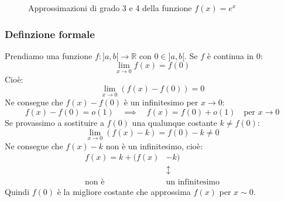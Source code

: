 \begin{figure}
\centering
\begin{subfigure}{0.49\textwidth}
\centering
\end{subfigure}
\begin{subfigure}{0.49\textwidth}
\centering
\end{subfigure}
	\caption{Approssimazioni di grado 3 e 4 della funzione $f(x) = e^x$} 
\label{fig:ApproxEsponenziale2}
\end{figure}



\subsubsection{Definzione formale}
Prendiamo una funzione $f:]a,b[ \to \mathbb{R}$ con $0 \in ]a,b[$. Se $f$ è continua in 0:
\begin{equation*}
	\lim_{x \to 0} f(x) = f(0)
\end{equation*}
Cioè:
\begin{equation*}
	\lim_{x \to 0} (f(x) - f(0)) = 0
\end{equation*}
Ne consegue che $f(x) - f(0)$ è un infinitesimo per $x \to 0$:
\begin{equation*}
	f(x) - f(0) = o(1) \quad \implies \quad f(x) = f(0) + o(1) \quad \text{per } x \to 0
\end{equation*}
Se provassimo a sostituire a $f(0)$ una qualunque costante $k \neq f(0)$:
\begin{equation*}
	\lim_{x \to 0} (f(x) - k) = f(0) - k \neq 0
\end{equation*}
Ne consegue che $f(x) - k$ non è un infinitesimo, cioè:
\begin{align*}
	f(x) = k + (f(x) &- k)\\
	&\updownarrow\\
	\text{non è } & \text{un infinitesimo}
\end{align*}
Quindi $f(0)$ è la migliore costante che approssima $f(x)$ per $x \sim 0$.\\

